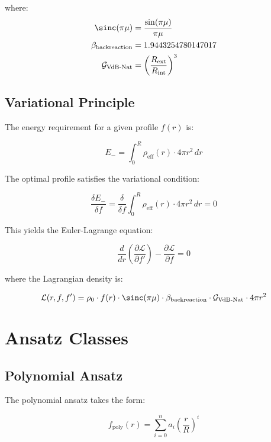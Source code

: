 \documentclass[12pt,a4paper]{article}
\begin{document}
where:
\begin{align}
\sinc(\pi\mu) &= \frac{\sin(\pi\mu)}{\pi\mu} \\
\beta_{\text{backreaction}} &= 1.9443254780147017 \\
\mathcal{G}_{\text{VdB-Nat}} &= \left(\frac{R_{\text{ext}}}{R_{\text{int}}}\right)^3
\end{align}

\subsection{Variational Principle}

The energy requirement for a given profile $f(r)$ is:

\begin{equation}
E_- = \int_0^R \rho_{\text{eff}}(r) \cdot 4\pi r^2 \, dr
\end{equation}

The optimal profile satisfies the variational condition:

\begin{equation}
\frac{\delta E_-}{\delta f} = \frac{\delta}{\delta f} \int_0^R \rho_{\text{eff}}(r) \cdot 4\pi r^2 \, dr = 0
\end{equation}

This yields the Euler-Lagrange equation:

\begin{equation}
\frac{d}{dr}\left(\frac{\partial \mathcal{L}}{\partial f'}\right) - \frac{\partial \mathcal{L}}{\partial f} = 0
\end{equation}

where the Lagrangian density is:

\begin{equation}
\mathcal{L}(r, f, f') = \rho_0 \cdot f(r) \cdot \sinc(\pi\mu) \cdot \beta_{\text{backreaction}} \cdot \mathcal{G}_{\text{VdB-Nat}} \cdot 4\pi r^2
\end{equation}

\section{Ansatz Classes}

\subsection{Polynomial Ansatz}

The polynomial ansatz takes the form:

\begin{equation}
f_{\text{poly}}(r) = \sum_{i=0}^n a_i \left(\frac{r}{R}\right)^i
\end{equation}
\end{document}
